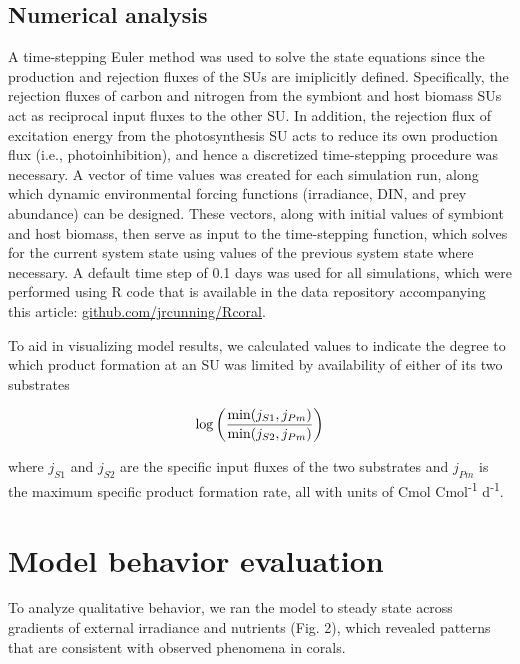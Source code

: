 \documentclass[]{elsarticle} %
\begin{document}
\subsection{Numerical analysis}\label{numerical-analysis}

A time-stepping Euler method was used to solve the state equations since
the production and rejection fluxes of the SUs are imiplicitly defined.
Specifically, the rejection fluxes of carbon and nitrogen from the
symbiont and host biomass SUs act as reciprocal input fluxes to the
other SU. In addition, the rejection flux of excitation energy from the
photosynthesis SU acts to reduce its own production flux (i.e.,
photoinhibition), and hence a discretized time-stepping procedure was
necessary. A vector of time values was created for each simulation run,
along which dynamic environmental forcing functions (irradiance, DIN,
and prey abundance) can be designed. These vectors, along with initial
values of symbiont and host biomass, then serve as input to the
time-stepping function, which solves for the current system state using
values of the previous system state where necessary. A default time step
of 0.1 days was used for all simulations, which were performed using R
code that is available in the data repository accompanying this article:
\url{github.com/jrcunning/Rcoral}.

To aid in visualizing model results, we calculated values to indicate
the degree to which product formation at an SU was limited by
availability of either of its two substrates

\begin{equation} \log \bigg({{\min(j_{S1}, j_{Pm})} \over {\min(j_{S2}, j_{Pm})}}\bigg) \end{equation}

where \(j_{S1}\) and \(j_{S2}\) are the specific input fluxes of the two
substrates and \(j_{Pm}\) is the maximum specific product formation
rate, all with units of Cmol Cmol\textsuperscript{-1}
d\textsuperscript{-1}.

\section{Model behavior evaluation}\label{model-behavior-evaluation}

To analyze qualitative behavior, we ran the model to steady state across
gradients of external irradiance and nutrients (Fig. 2), which revealed
patterns that are consistent with observed phenomena in corals.
\end{document}
